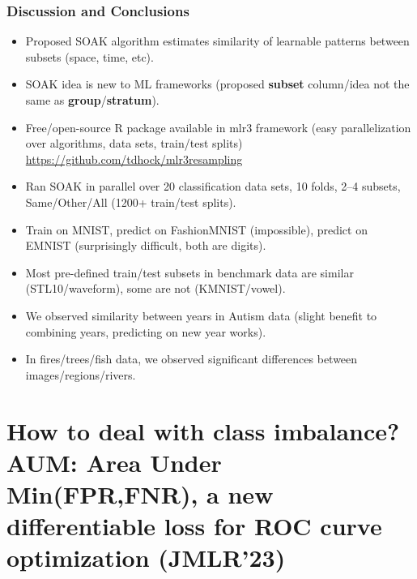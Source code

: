 \documentclass[t]{beamer}
\begin{document}
\begin{frame}
  \frametitle{Discussion and Conclusions}
  \begin{itemize}
  \item Proposed SOAK algorithm estimates similarity of
    learnable patterns between 
    subsets (space, time, etc).
  \item SOAK idea is new to ML frameworks (proposed \textbf{subset} column/idea not the same as \textbf{group}/\textbf{stratum}).
  \item Free/open-source R package available in mlr3 framework (easy
    parallelization over algorithms, data sets, train/test splits)
    \url{https://github.com/tdhock/mlr3resampling}
  \item Ran SOAK in parallel over 20 classification data sets, 10
    folds, 2--4 subsets, Same/Other/All (1200+ train/test splits).
  \item Train on MNIST, predict on FashionMNIST (impossible), predict
    on EMNIST (surprisingly difficult, both are digits).
  \item Most pre-defined train/test subsets in benchmark data
    are similar (STL10/waveform), some are not (KMNIST/vowel).
  \item We observed similarity between years in Autism data (slight benefit to combining years, predicting on new year works).
  \item In fires/trees/fish data, we observed
    significant differences between images/regions/rivers.
  \end{itemize}
\end{frame}


\section{How to deal with class imbalance? \\ AUM: Area Under Min(FPR,FNR), a new differentiable loss for ROC curve optimization (JMLR'23)} 
\end{document}
